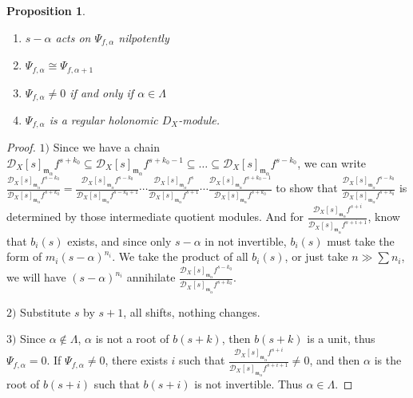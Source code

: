 \documentclass[openany]{book}
\newtheorem{proposition}[theorem]{Proposition} %
\theoremstyle{definition} %
\theoremstyle{remark}
\begin{document}
\begin{proposition}
    \quad

    \begin{enumerate}
        \item $s - \alpha$ acts on $\Psi_{f,\alpha}$ nilpotently
        \item $\Psi_{f,\alpha} \cong \Psi_{f,\alpha+1}$
        \item $\Psi_{f,\alpha} \neq 0$ if and only if $\alpha \in \Lambda$
        \item $\Psi_{f,\alpha}$ is a regular holonomic $D_X$-module.
    \end{enumerate}
\end{proposition}
\begin{proof}
    $1)$  Since we have a chain $\mathcal{D}_{X}[s]_{\mathfrak{m}_{\alpha}}f^{s+k_{0}}\subseteq\mathcal{D}_{X}[s]_{\mathfrak{m}_{\alpha}}f^{s+k_{0}-1}\subseteq\dots\subseteq \mathcal{D}_{X}[s]_{\mathfrak{m}_{\alpha}}f^{s-k_{0}}$, we can write $\frac{\mathcal{D}_{X}[s]_{\mathfrak{m}_{\alpha}}f^{s-k_{0}}}{\mathcal{D}_{X}[s]_{\mathfrak{m}_{\alpha}}f^{s+k_{0}}}=\frac{\mathcal{D}_{X}[s]_{\mathfrak{m}_{\alpha}}f^{s-k_{0}}}{\mathcal{D}_{X}[s]_{\mathfrak{m}_{\alpha}}f^{s-k_{0}+1}}\cdots\frac{\mathcal{D}_{X}[s]_{\mathfrak{m}_{\alpha}}f^{s}}{\mathcal{D}_{X}[s]_{\mathfrak{m}_{\alpha}}f^{s+1}}\cdots\frac{\mathcal{D}_{X}[s]_{\mathfrak{m}_{\alpha}}f^{s+k_{0}-1}}{\mathcal{D}_{X}[s]_{\mathfrak{m}_{\alpha}}f^{s+k_{0}}}$ to show that $\frac{\mathcal{D}_{X}[s]_{\mathfrak{m}_{\alpha}}f^{s-k_{0}}}{\mathcal{D}_{X}[s]_{\mathfrak{m}_{\alpha}}f^{s+k_{0}}}$ is determined by those intermediate quotient modules. And for $\frac{\mathcal{D}_{X}[s]_{\mathfrak{m}_{\alpha}}f^{s+i}}{\mathcal{D}_{X}[s]_{\mathfrak{m}_{\alpha}}f^{s+i+1}}$, know that $b_{i}(s)$ exists, and since only $s-\alpha$ in not invertible, $b_{i}(s)$ must take the form of $m_{i}(s-\alpha)^{n_{i}}$. We take the product of all $b_{i}(s)$, or just take $n\gg \sum n_{i}$, we will have $(s-\alpha)^{n_{i}}$ annihilate $\frac{\mathcal{D}_{X}[s]_{\mathfrak{m}_{\alpha}}f^{s-k_{0}}}{\mathcal{D}_{X}[s]_{\mathfrak{m}_{\alpha}}f^{s+k_{0}}}$.

    $2)$ Substitute $s$ by $s+1$, all shifts, nothing changes.

    $3)$ Since $\alpha \not\in\Lambda$, $\alpha$ is not a root of $b(s+k)$, then $b(s+k)$ is a unit, thus $\Psi_{f,\alpha}=0$.
    If $\Psi_{f,\alpha}\neq 0$, there exists $i$ such that $\frac{\mathcal{D}_{X}[s]_{\mathfrak{m}_{\alpha}}f^{s+i}}{\mathcal{D}_{X}[s]_{\mathfrak{m}_{\alpha}}f^{s+i+1}}\neq 0$, and then $\alpha$ is the root of $b(s+i)$ such that $b(s+i)$ is not invertible. Thus $\alpha\in\Lambda$.


\end{proof}
\end{document}
